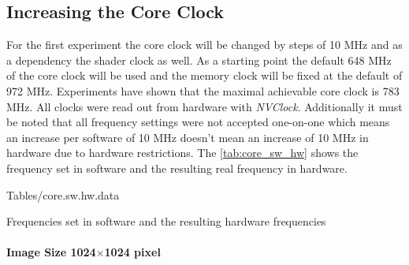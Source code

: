 \subsection{Increasing the Core Clock} %
\label{sub:increasing_the_core_clock}
For the first experiment the core clock will be changed by steps of 10 \gls{MHz}
and as a dependency the shader clock as well. As a starting point the default
648 \gls{MHz} of the core clock will be used and the memory clock will be fixed
at the default of 972 \gls{MHz}. Experiments have shown that the maximal
achievable core clock is 783 \gls{MHz}. All clocks were read out from hardware
with \emph{NVClock}. Additionally it must be noted that all frequency settings
were not accepted one-on-one which means an increase per software of 10 \gls{MHz}
doesn't mean an increase of 10 \gls{MHz} in hardware due to hardware restrictions.
The \autoref{tab:core_sw_hw} shows the frequency set in software and the resulting
real frequency in hardware. 
\begin{table}[ht]
    \centering
	
	\pgfplotstabletypeset%
												{Tables/core.sw.hw.data}

 	\caption{Frequencies set in software and the resulting hardware frequencies}
 	\label{tab:core_sw_hw}
\end{table}


\paragraph{Image Size 1024$\times$1024 pixel} %
\label{par:image_size_256_times_256_pixel}
















